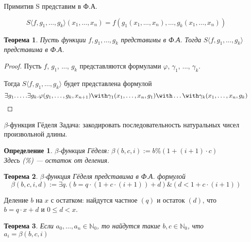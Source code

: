 \documentclass[aspectratio=169]{beamer}
\newtheorem{thm}{Теорема}[section]
\newtheorem{dfn}{Определение}[section]
\begin{document}
\begin{frame}{Примитив S представим в Ф.А.}

$$S\langle f,g_1,\dots,g_k\rangle(x_1,\dots,x_n) = f(g_1(x_1,\dots,x_n),\dots,g_k(x_1,\dots,x_n))$$\pause
\begin{thm}
Пусть функции $f,g_1,\dots,g_k$ представимы в Ф.А. Тогда $S\langle f,g_1,\dots,g_k \rangle$ представима в Ф.А.
\end{thm}\pause

\begin{proof}
Пусть $f$, $g_1$, ..., $g_k$ представляются формулами $\varphi$, $\gamma_1$, ..., $\gamma_k$. \pause

Тогда 
$S\langle f,g_1,\dots,g_k\rangle$ будет представлена формулой
$$\exists g_1.\dots.\exists g_k.\varphi(g_1,\dots,g_k,x_{n+1})\with\gamma_1(x_1,\dots,x_n,g_1)\with\dots\with\gamma_k(x_1,\dots,x_n,g_k)$$
\end{proof}

\end{frame}

\begin{frame}{$\beta$-функция Гёделя}
Задача: закодировать последовательность натуральных чисел произвольной длины.\pause
\begin{dfn}$\beta$-функция Гёделя: $\beta(b,c,i) := b \% (1 + (i+1) \cdot c)$\\
Здесь (\%) --- остаток от деления.
\end{dfn}\pause
\begin{thm}$\beta$-функция Гёделя представима в Ф.А. формулой
$$\beta (b,c,i,d) := \exists q.(b = q \cdot (1 + c \cdot (i+1)) + d) \& (d < 1 + c \cdot (i+1))$$
\end{thm}\pause\vspace{-0.3cm}
Деление $b$ на $x$ с остатком: найдутся частное $(q)$ и остаток $(d)$, что
$b = q\cdot x + d$ и $0 \le d < x$.
\pause
\begin{thm}Если $a_0, \dots, a_n \in \mathbb{N}_0$, то найдутся такие $b,c \in \mathbb{N}_0$, что
$a_i = \beta(b,c,i)$
\end{thm}
\end{frame}
\end{document}
